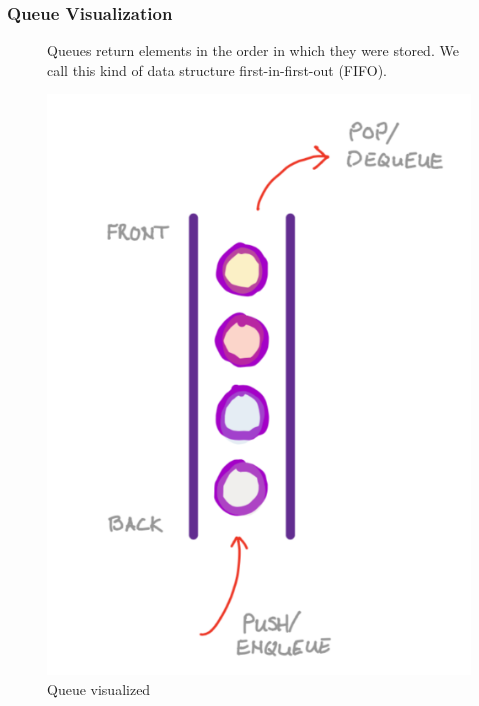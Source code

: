 \subsubsection{Queue Visualization}
\begin{figure}[h]
	\centering 
	\begin{minipage}[b]{0.45\textwidth}
		\raggedright
		Queues return elements in the order in which they were stored. We call this kind of data structure first-in-first-out (FIFO).
	\end{minipage}
	\hfill
	\begin{minipage}[c]{0.3\textwidth}
		\centering
		\includegraphics[width=\textwidth]{figures/queue-animation}
		\caption{Queue visualized}
	\end{minipage}
\end{figure}

